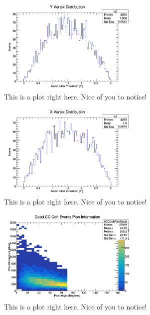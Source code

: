 \documentclass[11pt]{article}
\begin{document}
\begin{figure}[H]
\centering
\includegraphics[width=0.6\textwidth]{NewANMBergerSehgalImages/3-YVertexDistributionANMBS.png}
\caption{This is a plot right here. Nice of you to notice!}
\end{figure}

\begin{figure}[H]
\centering
\includegraphics[width=0.6\textwidth]{NewANMBergerSehgalImages/4-XVertexDistributionANMBS.png}
\caption{This is a plot right here. Nice of you to notice!}
\end{figure}

\begin{figure}[H]
\centering
\includegraphics[width=0.6\textwidth]{NewANMBergerSehgalImages/5-GoodCCCohPionInfoANMBS.png}
\caption{This is a plot right here. Nice of you to notice!}
\end{figure}
\end{document}
